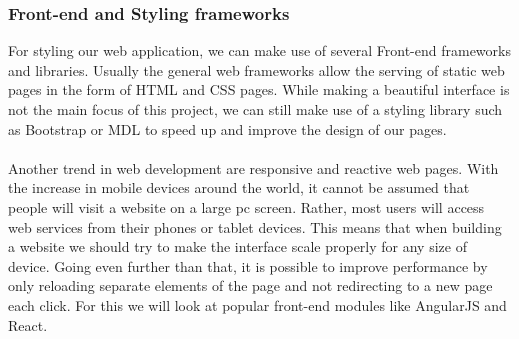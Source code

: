 \documentclass[12pt]{article}
\begin{document}
\begin{multicols}{2}
\subsubsection{Front-end and Styling frameworks}
For styling our web application, we can make use of several Front-end frameworks and libraries. Usually the general web frameworks allow the serving of static web pages in the form of HTML and CSS pages. While making a beautiful interface is not the main focus of this project, we can still make use of a styling library such as Bootstrap or MDL to speed up and improve the design of our pages.
\\\\
Another trend in web development are responsive and reactive web pages. With the increase in mobile devices around the world, it cannot be assumed that people will visit a website on a large pc screen. Rather, most users will access web services from their phones or tablet devices. This means that when building a website we should try to make the interface scale properly for any size of device. Going even further than that, it is possible to improve performance by only reloading separate elements of the page and not redirecting to a new page each click. For this we will look at popular front-end modules like AngularJS and React. 

\end{multicols}
\end{document}
